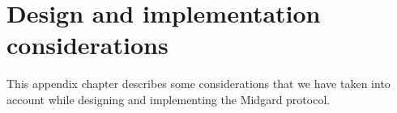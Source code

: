 \documentclass[../midgard.tex]{subfiles}
\begin{document}
\chapter{Design and implementation considerations}
\label{h:design-implementation-considerations}

This appendix chapter describes some considerations that we have taken into account while designing and implementing the Midgard protocol.

\end{document}
